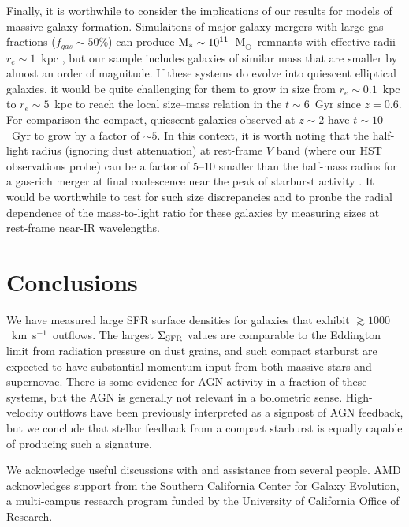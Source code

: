 \documentclass[apj]{emulateapj}
\newcommand{\kms}{km~s$^{-1}$}
\newcommand{\msun}{M$_{\odot}$}
\newcommand{\mstar}{M$_{*}$}
\newcommand{\sigmasfr}{\Sigma_{\textnormal{\scriptsize{SFR}}}}
\begin{document}
Finally, it is worthwhile to consider the implications of our results
for models of massive galaxy formation.  Simulaitons of major galaxy
mergers with large gas fractions ($f_{gas}\sim50$\%) can produce
$\textnormal{\mstar}\sim10^{11}$~\msun\ remnants with effective radii
$r_{e}\sim1$~kpc \citep[e.g.,][]{wuy10}, but our sample includes
galaxies of similar mass that are smaller by almost an order of
magnitude.  If these systems do evolve into quiescent elliptical
galaxies, it would be quite challenging for them to grow in size from
$r_e\sim0.1$~kpc to $r_e\sim5$~kpc to reach the local size--mass
relation \citep{she03} in the $t\sim6$~Gyr since $z=0.6$.  For
comparison the compact, quiescent galaxies observed at $z\sim2$
\citep[e.g.,][]{tru07,van08} have $t\sim10$~Gyr to grow by a factor of
$\sim5$.  In this context, it is worth noting that the half-light
radius (ignoring dust attenuation) at rest-frame $V$ band (where our
HST observations probe) can be a factor of 5--10 smaller than the
half-mass radius for a gas-rich merger at final coalescence near the
peak of starburst activity \citep{wuy10}.  It would be worthwhile to
test for such size discrepancies and to pronbe the radial dependence
of the mass-to-light ratio for these galaxies by measuring sizes at
rest-frame near-IR wavelengths.

 

\section{Conclusions}

We have measured large SFR surface densities for galaxies that exhibit
$\gtrsim1000$~\kms\ outflows.  The largest $\sigmasfr$ values are
comparable to the Eddington limit from radiation pressure on dust
grains, and such compact starburst are expected to have substantial
momentum input from both massive stars and supernovae.  There is some
evidence for AGN activity in a fraction of these systems, but the AGN
is generally not relevant in a bolometric sense.  High-velocity
outflows have been previously interpreted as a signpost of AGN
feedback, but we conclude that stellar feedback from a compact
starburst is equally capable of producing such a signature.


\acknowledgments

We acknowledge useful discussions with and assistance from several
people.  AMD acknowledges support from the Southern California Center
for Galaxy Evolution, a multi-campus research program funded by the
University of California Office of Research.
\end{document}
